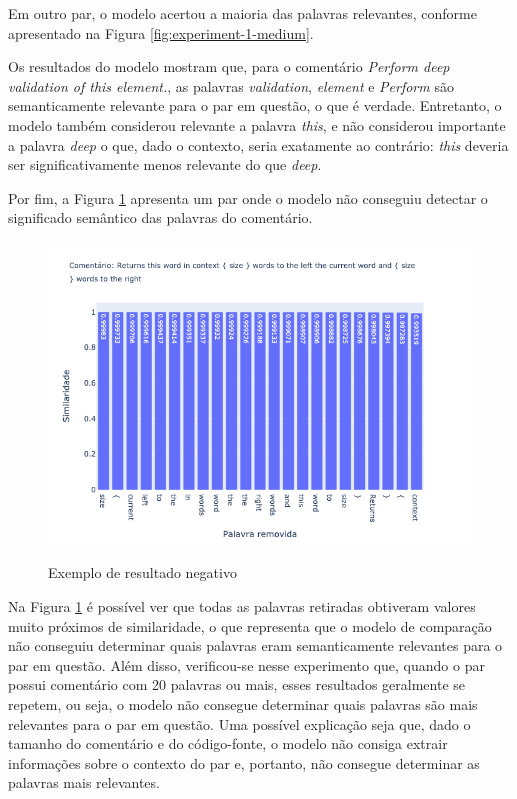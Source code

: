 Em outro par, o modelo acertou a maioria das palavras relevantes, conforme apresentado na Figura \ref{fig:experiment-1-medium}.

Os resultados do modelo mostram que, para o comentário \textit{Perform deep validation of this element.}, as palavras \textit{validation}, \textit{element} e \textit{Perform} são semanticamente relevante para o par em questão, o que é verdade. Entretanto, o modelo também considerou relevante a palavra \textit{this}, e não considerou importante a palavra \textit{deep} o que, dado o contexto, seria exatamente ao contrário: \textit{this} deveria ser significativamente menos relevante do que \textit{deep}.

Por fim, a Figura \ref{fig:experiment-1-bad} apresenta um par onde o modelo não conseguiu detectar o significado semântico das palavras do comentário.

\begin{figure}[H]
  \centering
    \caption{Exemplo de resultado negativo}
    \includegraphics[scale=0.6]{imagens/resultados/experiment-1/sample_29.png}
    \label{fig:experiment-1-bad}
\end{figure}

Na Figura \ref{fig:experiment-1-bad} é possível ver que todas as palavras retiradas obtiveram valores muito próximos de similaridade, o que representa que o modelo de comparação não conseguiu determinar quais palavras eram semanticamente relevantes para o par em questão. Além disso, verificou-se nesse experimento que, quando o par possui comentário com 20 palavras ou mais, esses resultados geralmente se repetem, ou seja, o modelo não consegue determinar quais palavras são mais relevantes para o par em questão. Uma possível explicação seja que, dado o tamanho do comentário e do código-fonte, o modelo não consiga extrair informações sobre o contexto do par e, portanto, não consegue determinar as palavras mais relevantes.

